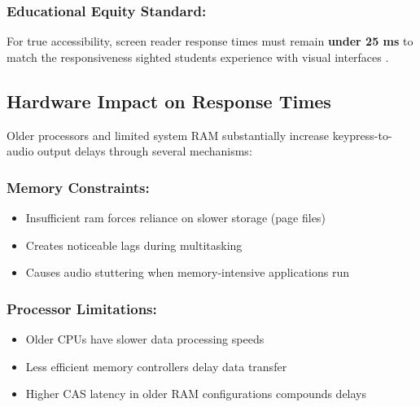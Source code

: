 \subsubsection{Educational Equity Standard:}

For true accessibility, screen reader response times must remain \textbf{under 25 ms} to match the responsiveness sighted students experience with visual interfaces \supercite{W3C2018WCAG21}.

\subsection{Hardware Impact on Response Times}\label{hardware-impact-on-response-times}

Older processors and limited system RAM substantially increase keypress-to-audio output delays through several mechanisms:

\subsubsection{Memory Constraints:}

\begin{itemize}
	\item Insufficient \gls{ram} forces reliance on slower storage (page files) \supercite{Microsoft2023WindowsPerformance}
	\item Creates noticeable lags during multitasking \supercite{Intel2024ProcessorMemory}
	\item Causes \gls{audio} stuttering when memory-intensive applications run \supercite{Realtek2023AudioDriverPerformance}
\end{itemize}


\subsubsection{Processor Limitations:}

\begin{itemize}
	\item Older CPUs have slower data processing speeds \supercite{AMD2024RyzenPerformance}
	\item Less efficient memory controllers delay data transfer \supercite{AnandTech2023MemoryControllers}
	\item Higher CAS latency in older RAM configurations compounds delays \supercite{TechSpot2023RAMTimings}
\end{itemize}


